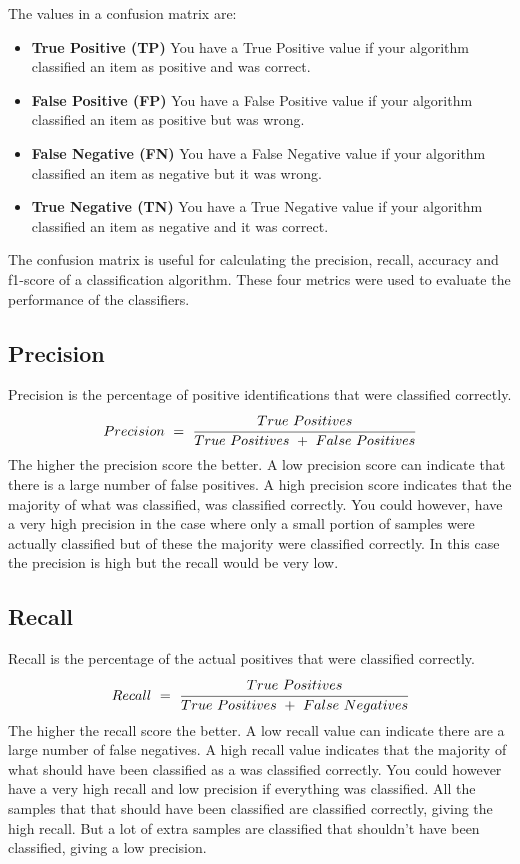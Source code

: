 The values in a confusion matrix are:
\begin{itemize}
    \item \textbf{True Positive (TP)}\newline
    You have a True Positive value if your algorithm classified an item as positive and was correct.
    \item \textbf{False Positive (FP)}\newline
    You have a False Positive value if your algorithm classified an item as positive but was wrong.
    \item \textbf{False Negative (FN)}\newline
    You have a False Negative value if your algorithm classified an item as negative but it was wrong.
    \item \textbf{True Negative (TN)}\newline
    You have a True Negative value if your algorithm classified an item as negative and it was correct.
\end{itemize}

The confusion matrix is useful for calculating the precision, recall, accuracy and f1-score of a classification algorithm. These four metrics were used to evaluate the performance of the classifiers.

\subsection*{Precision}
Precision is the percentage of positive identifications that were classified correctly.
\begin{equation}
    Precision\ =\ \cfrac{True\ Positives}{True\ Positives\ +\ False\ Positives}
\end{equation}
The higher the precision score the better. A low precision score can indicate that there is a large number of false positives. A high precision score indicates that the majority of what was classified, was classified correctly. You could however, have a very high precision in the case where only a small portion of samples were actually classified but of these the majority were classified correctly. In this case the precision is high but the recall would be very low.

\subsection*{Recall}
Recall is the percentage of the actual positives that were classified correctly.
\begin{equation}
    Recall\ =\ \cfrac{True\ Positives}{True\ Positives\ +\ False\ Negatives}
\end{equation}
The higher the recall score the better. A low recall value can indicate there are a large number of false negatives. A high recall value indicates that the majority of what should have been classified as a was classified correctly. You could however have a very high recall and low precision if everything was classified. All the samples that that should have been classified are classified correctly, giving the high recall. But a lot of extra samples are classified that shouldn't have been classified, giving a low precision.

